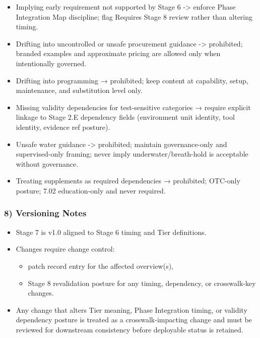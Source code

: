 \documentclass[10pt]{article}
\begin{document}
\begin{itemize}
\item Implying early requirement not supported by Stage 6 -> enforce Phase Integration Map discipline; flag Requires Stage 8 review rather than altering timing.
\item Drifting into uncontrolled or unsafe procurement guidance -> prohibited; branded examples and approximate pricing are allowed only when intentionally governed.
\item Drifting into programming → prohibited; keep content at capability, setup, maintenance, and substitution level only.
\item Missing validity dependencies for test-sensitive categories → require explicit linkage to Stage 2.E dependency fields (environment unit identity, tool identity, evidence ref posture).
\item Unsafe water guidance -> prohibited; maintain governance-only and supervised-only framing; never imply underwater/breath-hold is acceptable without governance.
\item Treating supplements as required dependencies → prohibited; OTC-only posture; 7.02 education-only and never required.
\end{itemize}

\subsubsection*{8) Versioning Notes}

\begin{itemize}
\item Stage 7 is v1.0 aligned to Stage 6 timing and Tier definitions.
\item Changes require change control:
  \begin{itemize}
  \item patch record entry for the affected overview(s),
  \item Stage 8 revalidation posture for any timing, dependency, or crosswalk-key changes.
  \end{itemize}
\item Any change that alters Tier meaning, Phase Integration timing, or validity dependency posture is treated as a crosswalk-impacting change and must be reviewed for downstream consistency before deployable status is retained.
\end{itemize}
\end{document}
